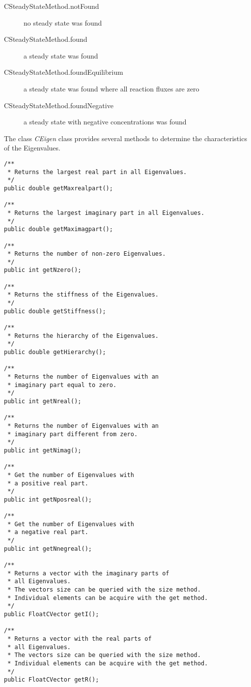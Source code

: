 \documentclass[a4,10pt]{article}
\begin{document}
\begin{description}
\item[CSteadyStateMethod.notFound]{no steady state was found}
\item[CSteadyStateMethod.found]{a steady state was found}
\item[CSteadyStateMethod.foundEquilibrium]{a steady state was found where all reaction fluxes are zero}
\item[CSteadyStateMethod.foundNegative]{a steady state with negative concentrations was found}
\end{description}

The class \textit{CEigen} class provides several methods to determine the characteristics of the Eigenvalues.

\begin{lstlisting}
/**
 * Returns the largest real part in all Eigenvalues.
 */
public double getMaxrealpart();

/**
 * Returns the largest imaginary part in all Eigenvalues.
 */
public double getMaximagpart();

/**
 * Returns the number of non-zero Eigenvalues.
 */
public int getNzero();

/**
 * Returns the stiffness of the Eigenvalues.
 */
public double getStiffness();

/**
 * Returns the hierarchy of the Eigenvalues.
 */
public double getHierarchy();

/**
 * Returns the number of Eigenvalues with an
 * imaginary part equal to zero.
 */
public int getNreal();

/**
 * Returns the number of Eigenvalues with an
 * imaginary part different from zero.
 */
public int getNimag();

/**
 * Get the number of Eigenvalues with
 * a positive real part.
 */
public int getNposreal();

/**
 * Get the number of Eigenvalues with
 * a negative real part.
 */
public int getNnegreal();

/**
 * Returns a vector with the imaginary parts of
 * all Eigenvalues.
 * The vectors size can be queried with the size method.
 * Individual elements can be acquire with the get method.
 */
public FloatCVector getI();

/**
 * Returns a vector with the real parts of
 * all Eigenvalues.
 * The vectors size can be queried with the size method.
 * Individual elements can be acquire with the get method.
 */
public FloatCVector getR();
\end{lstlisting}
\end{document}
